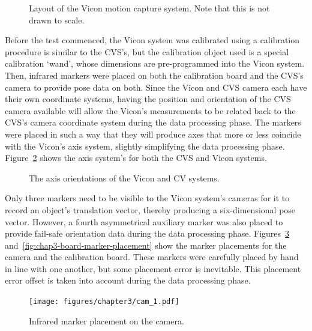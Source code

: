 \begin{figure}
  \centering
  \def\svgwidth{0.5\textwidth}
  
  \caption[Layout of the Vicon motion capture system.]{Layout of the Vicon motion capture system. Note that this is not drawn to scale.}
\label{fig:chap3-vicon-layout}
\end{figure}

Before the test commenced, the Vicon system was calibrated using a calibration procedure is similar to the CVS's, but the calibration object used is a special calibration `wand', whose dimensions are pre-programmed into the Vicon system. Then, infrared markers were placed on both the calibration board and the CVS's camera to provide pose data on both. Since the Vicon and CVS camera each have their own coordinate systems, having the position and orientation of the CVS camera available will allow the Vicon's measurements to be related back to the CVS's camera coordinate system during the data processing phase. The markers were placed in such a way that they will produce axes that more or less coincide with the Vicon's axis system, slightly simplifying the data processing phase. Figure~\ref{fig:chap3-cam-vicon-axes} shows the axis system's for both the CVS and Vicon systems.

\begin{figure}
  \centering
  \def\svgwidth{0.5\textwidth}
  
  \caption{The axis orientations of the Vicon and CV systems.}
\label{fig:chap3-cam-vicon-axes}
\end{figure}

Only three markers need to be visible to the Vicon system's cameras for it to record an object's translation vector, thereby producing a six-dimensional pose vector. However, a fourth asymmetrical auxiliary marker was also placed to provide fail-safe orientation data during the data processing phase. Figures~\ref{fig:chap3-cam-marker-placement} and~\ref{fig:chap3-board-marker-placement} show the marker placements for the camera and the calibration board. These markers were carefully placed by hand in line with one another, but some placement error is inevitable. This placement error offset is taken into account during the data processing phase. 

\begin{figure}
   \centering 
   \texttt{[image: figures/chapter3/cam\_1.pdf]}
   \caption{Infrared marker placement on the camera.}
\label{fig:chap3-cam-marker-placement}
\end{figure}

